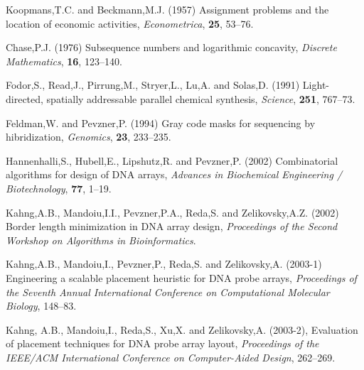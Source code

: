 \documentclass{bioinfo}
\begin{document}
\begin{thebibliography}{}

 Koopmans,T.C. and Beckmann,M.J. (1957) Assignment problems and the location of economic activities, {\it Econometrica}, {\bf 25}, 53--76.

 Chase,P.J. (1976) Subsequence numbers and logarithmic concavity, {\it Discrete Mathematics}, {\bf 16}, 123--140.

 Fodor,S., Read,J., Pirrung,M., Stryer,L., Lu,A. and Solas,D. (1991) Light-directed, spatially addressable parallel chemical synthesis, {\it Science}, {\bf 251}, 767--73.

 Feldman,W. and Pevzner,P. (1994) Gray code masks for sequencing by hibridization, {\it Genomics}, {\bf 23}, 233--235.

 Hannenhalli,S., Hubell,E., Lipshutz,R. and Pevzner,P. (2002) Combinatorial algorithms for design of DNA arrays, {\it Advances in Biochemical Engineering / Biotechnology}, {\bf 77}, 1--19.

 Kahng,A.B., Mandoiu,I.I., Pevzner,P.A., Reda,S. and Zelikovsky,A.Z. (2002) Border length minimization in DNA array design, {\it Proceedings of the Second Workshop on Algorithms in Bioinformatics}.

 Kahng,A.B., Mandoiu,I., Pevzner,P., Reda,S. and Zelikovsky,A. (2003-1) Engineering a scalable placement heuristic for DNA probe arrays, {\it Proceedings of the Seventh Annual International Conference on Computational Molecular Biology}, 148--83.

 Kahng, A.B., Mandoiu,I., Reda,S., Xu,X. and Zelikovsky,A. (2003-2), Evaluation of placement techniques for DNA probe array layout, {\it Proceedings of the IEEE/ACM International Conference on Computer-Aided Design}, 262--269.

\end{thebibliography}
\end{document}
